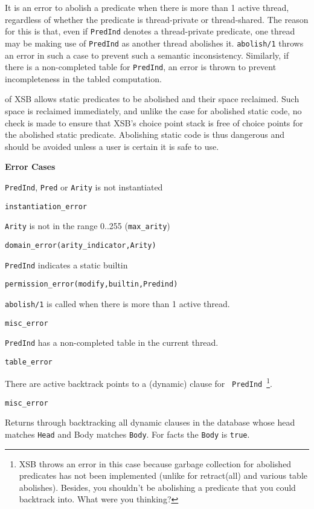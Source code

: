 \begin{description}
It is an error to abolish a predicate when there is more than 1 active
thread, regardless of whether the predicate is thread-private or
thread-shared.  The reason for this is that, even if {\tt PredInd}
denotes a thread-private predicate, one thread may be making use of
{\tt PredInd} as another thread abolishes it.  {\tt abolish/1} throws
an error in such a case to prevent such a semantic inconsistency.
Similarly, if there is a non-completed table for {\tt PredInd}, an
error is thrown to prevent incompleteness in the tabled computation.

\compatability \version{} of XSB allows static predicates to be
abolished and their space reclaimed.  Such space is reclaimed
immediately, and unlike the case for abolished static code,  no check
is made to ensure that XSB's choice point stack is free of choice
points for the abolished static predicate.  Abolishing static code is
thus dangerous and should be avoided unless a user is certain it is
safe to use.

{\bf Error Cases}
\bi
\item 	{\tt PredInd}, {\tt Pred} or {\tt Arity} is not instantiated
\bi
\item 	{\tt instantiation\_error}
\ei
%
\item 	{\tt Arity} is not in the range 0..255 ({\tt max\_arity})
\bi
\item 	{\tt domain\_error(arity\_indicator,Arity)}
\ei
%
\item 	{\tt PredInd} indicates a static builtin
\bi
\item 	{\tt permission\_error(modify,builtin,Predind)}
\ei
%
\item {\tt abolish/1} is called when there is more than 1 active thread.
\bi
\item {\tt misc\_error}
\ei
%
\item {\tt PredInd} has a non-completed table in the current thread.
\bi
\item {\tt table\_error}
\ei
%
\item There are active backtrack points to a (dynamic) clause for {\tt
  PredInd}~\footnote{XSB throws an error in this case because garbage
  collection for abolished predicates has not been implemented
  (unlike for retract(all) and various table abolishes).  Besides, you
  shouldn't be abolishing a predicate that you could backtrack into.
  What were you thinking?}. 
\bi
\item {\tt misc\_error}
\ei
%
\ei

Returns through backtracking all dynamic clauses in the database whose head
matches {\tt Head} and Body matches {\tt Body}.  For facts the {\tt Body} is
{\tt true}.  


\end{description}
